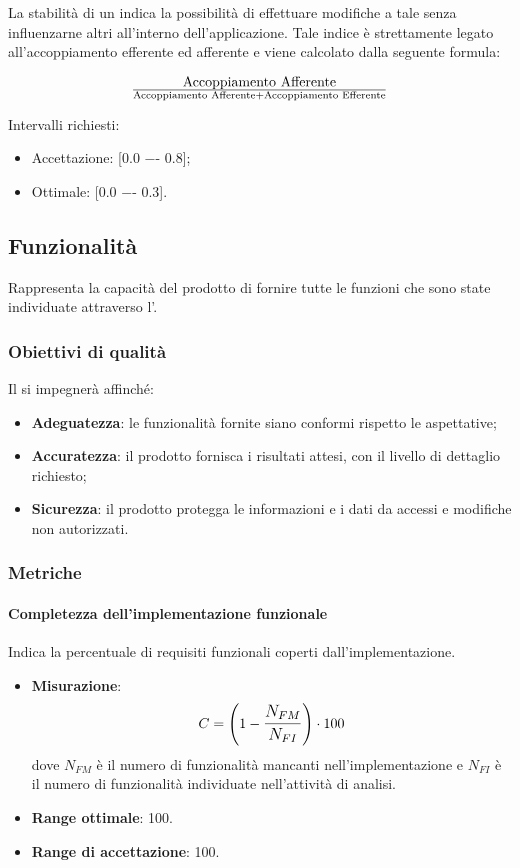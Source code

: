 La stabilità di un  indica la possibilità di effettuare modifiche a tale  senza influenzarne altri all'interno dell'applicazione. Tale indice è strettamente legato all'accoppiamento efferente ed afferente e viene calcolato dalla seguente formula:

\begin{displaymath}
{\text{Accoppiamento Afferente}}\over{\text{Accoppiamento Afferente} + \text{Accoppiamento Efferente}}
\end{displaymath}

Intervalli richiesti:
\begin{itemize}
\item
Accettazione: [0.0 −- 0.8];
\item
Ottimale: [0.0 −- 0.3].
\end{itemize}

\subsection{Funzionalità}
Rappresenta la capacità del prodotto di fornire tutte le funzioni che sono state individuate attraverso l'\AdR.

\subsubsection{Obiettivi di qualità}
Il  si impegnerà affinché:
\begin{itemize}
\item \textbf{Adeguatezza}: le funzionalità fornite siano conformi rispetto le aspettative;
\item \textbf{Accuratezza}: il prodotto fornisca i risultati attesi, con il livello di dettaglio richiesto;
\item \textbf{Sicurezza}: il prodotto protegga le informazioni e i dati da accessi e modifiche non autorizzati.
\end{itemize}

\subsubsection{Metriche}
\paragraph{Completezza dell'implementazione funzionale}
Indica la percentuale di requisiti funzionali coperti dall'implementazione.
\begin{itemize}
	\item \textbf{Misurazione}: 
		$$C=\left(1-\mathlarger{\frac{N_{FM}}{N_{FI}}}\right) \cdot 100$$ 
	dove $N_{FM}$ è il numero di funzionalità mancanti nell'implementazione e $N_{FI}$ è il numero di funzionalità individuate nell'attività di analisi.
	\item \textbf{Range ottimale}: 100.
	\item \textbf{Range di accettazione}: 100.
\end{itemize}

